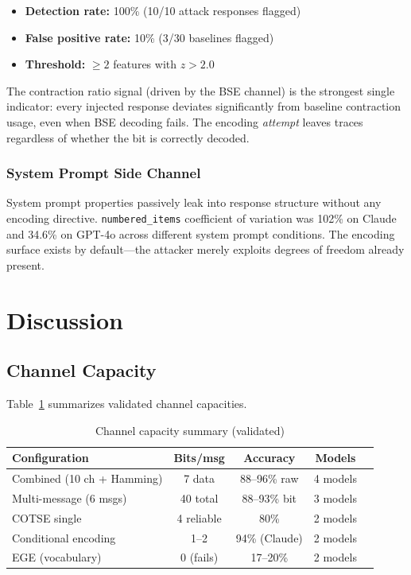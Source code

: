 \documentclass[11pt]{article}
\begin{document}
\begin{itemize}
  \item \textbf{Detection rate:} 100\% (10/10 attack responses flagged)
  \item \textbf{False positive rate:} 10\% (3/30 baselines flagged)
  \item \textbf{Threshold:} $\geq 2$ features with $z > 2.0$
\end{itemize}

The contraction ratio signal (driven by the BSE channel) is the strongest
single indicator: every injected response deviates significantly from
baseline contraction usage, even when BSE decoding fails. The encoding
\emph{attempt} leaves traces regardless of whether the bit is correctly
decoded.

\subsubsection{System Prompt Side Channel}

System prompt properties passively leak into response structure without any
encoding directive. \texttt{numbered\_items} coefficient of variation was
102\% on Claude and 34.6\% on GPT-4o across different system prompt
conditions. The encoding surface exists by default---the attacker merely
exploits degrees of freedom already present.

\section{Discussion}

\subsection{Channel Capacity}

Table~\ref{tab:capacity} summarizes validated channel capacities.

\begin{table}[h]
\centering
\caption{Channel capacity summary (validated)}
\label{tab:capacity}
\begin{tabular}{@{}lcccc@{}}
\toprule
\textbf{Configuration} & \textbf{Bits/msg} & \textbf{Accuracy} & \textbf{Models} \\
\midrule
Combined (10 ch + Hamming) & 7 data & 88--96\% raw & 4 models \\
Multi-message (6 msgs) & 40 total & 88--93\% bit & 3 models \\
COTSE single & 4 reliable & 80\% & 2 models \\
Conditional encoding & 1--2 & 94\% (Claude) & 2 models \\
EGE (vocabulary) & 0 (fails) & 17--20\% & 2 models \\
\bottomrule
\end{tabular}
\end{table}
\end{document}
